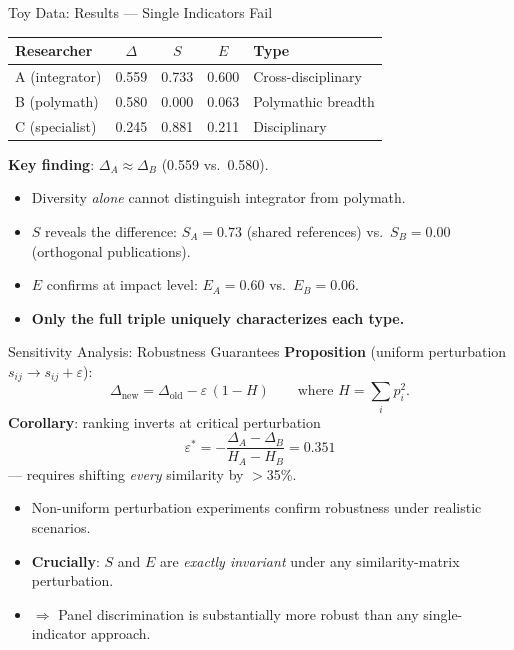 \documentclass[aspectratio=169,10pt]{beamer}
\begin{document}
\begin{frame}{Toy Data: Results --- Single Indicators Fail}
\begin{table}
\centering
\begin{tabular}{@{}l ccc l@{}}
\toprule
\textbf{Researcher} & $\Delta$ & $S$ & $E$ & \textbf{Type} \\
\midrule
A (integrator)   & 0.559 & 0.733 & 0.600 & Cross-disciplinary \\
B (polymath)     & 0.580 & 0.000 & 0.063 & Polymathic breadth \\
C (specialist)   & 0.245 & 0.881 & 0.211 & Disciplinary \\
\bottomrule
\end{tabular}
\end{table}
\bigskip
\textbf{Key finding}: $\Delta_A \approx \Delta_B$ (0.559 vs.\ 0.580).
\begin{itemize}
  \item Diversity \emph{alone} cannot distinguish integrator from polymath.
  \item $S$ reveals the difference: $S_A = 0.73$ (shared references)
        vs.\ $S_B = 0.00$ (orthogonal publications).
  \item $E$ confirms at impact level: $E_A = 0.60$ vs.\ $E_B = 0.06$.
  \item \textbf{Only the full triple uniquely characterizes each type.}
\end{itemize}
\end{frame}

\begin{frame}{Sensitivity Analysis: Robustness Guarantees}
\textbf{Proposition} (uniform perturbation $s_{ij} \to s_{ij} + \varepsilon$):
\[
  \Delta_\mathrm{new} = \Delta_\mathrm{old} - \varepsilon\,(1 - H)
  \qquad\text{where } H = \textstyle\sum_i p_i^2.
\]
\textbf{Corollary}: ranking inverts at critical perturbation
\[
  \varepsilon^* = -\frac{\Delta_A - \Delta_B}{H_A - H_B} = 0.351
\]
--- requires shifting \emph{every} similarity by $>$35\%.

\medskip
\begin{itemize}
  \item Non-uniform perturbation experiments confirm robustness
        under realistic scenarios.
  \item \textbf{Crucially}: $S$ and $E$ are \emph{exactly invariant}
        under any similarity-matrix perturbation.
  \item $\Rightarrow$ Panel discrimination is substantially more robust
        than any single-indicator approach.
\end{itemize}
\end{frame}
\end{document}
